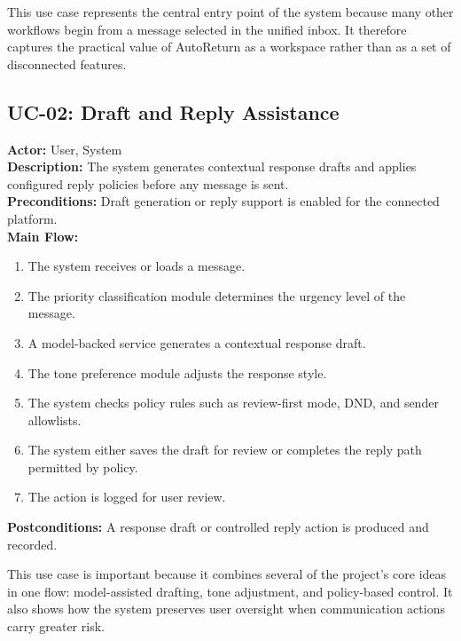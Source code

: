 This use case represents the central entry point of the system because many other workflows begin from a message selected in the unified inbox. It therefore captures the practical value of AutoReturn as a workspace rather than as a set of disconnected features.

\subsection{UC-02: Draft and Reply Assistance}
\textbf{Actor:} User, System \\
\textbf{Description:} The system generates contextual response drafts and applies configured reply policies before any message is sent. \\
\textbf{Preconditions:} Draft generation or reply support is enabled for the connected platform. \\
\textbf{Main Flow:}
\begin{enumerate}
    \item The system receives or loads a message.
    \item The priority classification module determines the urgency level of the message.
    \item A model-backed service generates a contextual response draft.
    \item The tone preference module adjusts the response style.
    \item The system checks policy rules such as review-first mode, DND, and sender allowlists.
    \item The system either saves the draft for review or completes the reply path permitted by policy.
    \item The action is logged for user review.
\end{enumerate}
\textbf{Postconditions:} A response draft or controlled reply action is produced and recorded.

This use case is important because it combines several of the project’s core ideas in one flow: model-assisted drafting, tone adjustment, and policy-based control. It also shows how the system preserves user oversight when communication actions carry greater risk.

